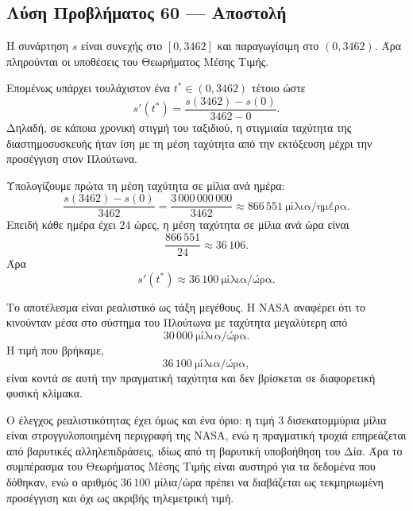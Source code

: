 \subsection*{Λύση Προβλήματος 60 --- Αποστολή }

\begin{alist}
  \item Η συνάρτηση \(s\) είναι συνεχής στο \([0,3462]\) και
        παραγωγίσιμη στο \((0,3462)\). Άρα πληρούνται οι υποθέσεις του
        Θεωρήματος Μέσης Τιμής.

        Επομένως υπάρχει τουλάχιστον ένα \(t^*\in(0,3462)\) τέτοιο ώστε
        \[
          s'(t^*)=
          \frac{s(3462)-s(0)}{3462-0}.
        \]
        Δηλαδή, σε κάποια χρονική στιγμή του ταξιδιού, η στιγμιαία
        ταχύτητα της διαστημοσυσκευής ήταν ίση με τη μέση ταχύτητα από
        την εκτόξευση μέχρι την προσέγγιση στον Πλούτωνα.

  \item Υπολογίζουμε πρώτα τη μέση ταχύτητα σε μίλια ανά ημέρα:
        \[
          \frac{s(3462)-s(0)}{3462}
          =
          \frac{3\,000\,000\,000}{3462}
          \approx
          866\,551\ \text{μίλια/ημέρα}.
        \]
        Επειδή κάθε ημέρα έχει \(24\) ώρες, η μέση ταχύτητα σε μίλια
        ανά ώρα είναι
        \[
          \frac{866\,551}{24}
          \approx
          36\,106.
        \]
        Άρα
        \[
          {
          s'(t^*)\approx36\,100\ \text{μίλια/ώρα}
          }.
        \]

  \item Το αποτέλεσμα είναι ρεαλιστικό ως τάξη μεγέθους. Η NASA αναφέρει
        ότι το  κινούνταν μέσα στο σύστημα του Πλούτωνα
        με ταχύτητα μεγαλύτερη από
        \[
          30\,000\ \text{μίλια/ώρα}.
        \]
        Η τιμή που βρήκαμε,
        \[
          36\,100\ \text{μίλια/ώρα},
        \]
        είναι κοντά σε αυτή την πραγματική ταχύτητα και δεν βρίσκεται σε
        διαφορετική φυσική κλίμακα.

        Ο έλεγχος ρεαλιστικότητας έχει όμως και ένα όριο: η τιμή
        \(3\) δισεκατομμύρια μίλια είναι στρογγυλοποιημένη περιγραφή
        της NASA, ενώ η πραγματική τροχιά επηρεάζεται από βαρυτικές
        αλληλεπιδράσεις, ιδίως από τη βαρυτική υποβοήθηση του Δία. Άρα
        το συμπέρασμα του Θεωρήματος Μέσης Τιμής είναι αυστηρό για τα
        δεδομένα που δόθηκαν, ενώ ο αριθμός \(36\,100\) μίλια/ώρα πρέπει
        να διαβάζεται ως τεκμηριωμένη προσέγγιση και όχι ως ακριβής
        τηλεμετρική τιμή.
\end{alist}

